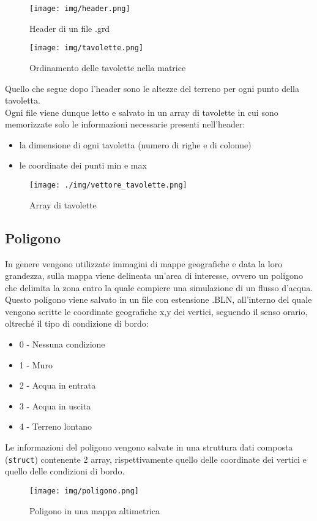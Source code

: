 		\begin{figure}[htbp]
			\centering
			\begin{minipage}[c]{.40\textwidth}
				\centering\setlength{\captionmargin}{0pt}
				\texttt{[image: img/header.png]}
				\caption{Header di un file .grd}
			\end{minipage}
			\hspace{1cm}
			\begin{minipage}[c]{.40\textwidth}
				\centering\setlength{\captionmargin}{0pt}
				\texttt{[image: img/tavolette.png]}
				\caption{Ordinamento delle tavolette nella matrice}
			\end{minipage}
		\end{figure}
		Quello che segue dopo l'header sono le altezze del terreno per ogni punto della tavoletta.\\ 	
		Ogni file viene dunque letto e salvato in un array di tavolette in cui sono memorizzate solo le informazioni necessarie presenti nell'header:
		\begin{itemize}
			\item la dimensione di ogni tavoletta (numero di righe e di colonne)
			\item le coordinate dei punti min e max
		\end{itemize}
		\begin{figure}[htbp]
			\centering
			\texttt{[image: ./img/vettore\_tavolette.png]}
			\caption{Array di tavolette}
		\end{figure}

	\subsection{Poligono}
		In genere vengono utilizzate immagini di mappe geografiche e data la loro grandezza, sulla mappa viene delineata un'area di interesse, ovvero un poligono che delimita la zona entro la quale compiere una simulazione di un flusso d'acqua. 
		Questo poligono viene salvato in un file con estensione .BLN, all'interno del quale vengono scritte le coordinate geografiche x,y dei vertici, seguendo il senso orario, oltrech\'{e} il tipo di condizione di bordo:
		\begin{itemize}
			\item 0 - Nessuna condizione
			\item 1 - Muro
			\item 2 - Acqua in entrata
			\item 3 - Acqua in uscita
			\item 4 - Terreno lontano
		\end{itemize}
		Le informazioni del poligono vengono salvate in una struttura dati composta (\texttt{struct}) contenente 2 array, rispettivamente quello delle coordinate dei vertici e quello delle condizioni di bordo.
		\begin{figure}[htbp]
			\centering
			\texttt{[image: img/poligono.png]}
			\caption{Poligono in una mappa altimetrica}
		\end{figure}

